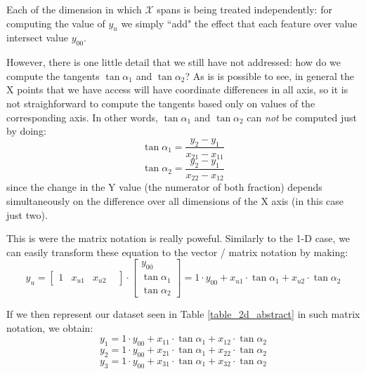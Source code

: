 Each of the dimension in which $\mathcal{X}$ spans is being treated independently: for computing the value of $y_u$ we simply ``add" the effect that each feature over value intersect value $y_{00}$. 

However, there is one little detail that we still have not addressed: how do we compute the tangents $\tan\alpha_1$ and $\tan\alpha_2$? As is is possible to see, in general the X points that we have access will have coordinate differences in all axis, so it is not straighforward to compute the tangents based only on values of the corresponding axis. In other words, $\tan\alpha_1$ and $\tan\alpha_2$ can \emph{not} be computed just by doing:
\begin{equation}
\tan\alpha_1 = \frac{y_2 - y_1}{x_{21} - x_{11}}
\label{eq.simple_tangent_2d_1}
\end{equation}
\begin{equation}
\tan\alpha_2 = \frac{y_2 - y_1}{x_{22} - x_{12}}
\label{eq.simple_tangent_2d_2t}
\end{equation}
since the change in the Y value (the numerator of both fraction) depends simultaneously on the difference over all dimensions of the X axis (in this case just two).

This is were the matrix notation is really poweful. Similarly to the 1-D case, we can easily transform these equation to the vector / matrix notation by making:
\begin{equation}
y_u =  
\begin{bmatrix}
1 &
x_{u1} &
x_{u2} &
\end{bmatrix}
\cdot
\begin{bmatrix}
y_{00} \\ 
\tan\alpha_1 \\
\tan\alpha_2
\end{bmatrix} 
=
1 \cdot y_{00} + x_{u1} \cdot \tan\alpha_1 + x_{u2} \cdot \tan\alpha_2
\end{equation}

If we then represent our dataset seen in Table \ref{table_2d_abstract} in such matrix notation, we obtain:
\begin{equation}
y_1 = 1 \cdot y_{00} + x_{11} \cdot \tan\alpha_1 + x_{12} \cdot \tan\alpha_2
\end{equation}
\begin{equation}
y_2 = 1 \cdot y_{00} + x_{21} \cdot \tan\alpha_1 + x_{22} \cdot \tan\alpha_2
\end{equation}
\begin{equation}
y_3 = 1 \cdot y_{00} + x_{31} \cdot \tan\alpha_1 + x_{32} \cdot \tan\alpha_2
\end{equation}

